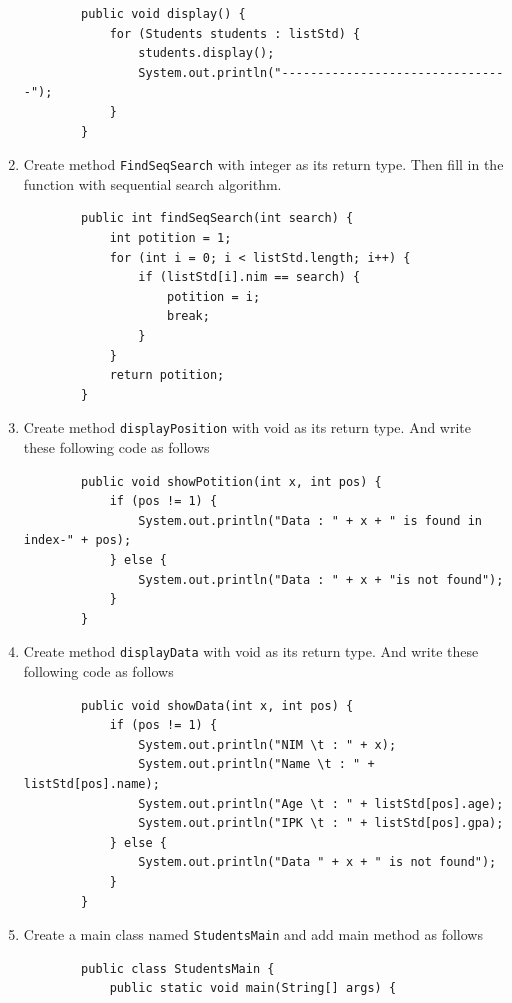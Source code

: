 \documentclass[12pt,titlepage]{article}
\begin{document}
\begin{enumerate}
    \begin{verbatim}
        public void display() {
            for (Students students : listStd) {
                students.display();
                System.out.println("--------------------------------");
            }
        }
    \end{verbatim}
    \item Create method \texttt{FindSeqSearch} with integer as its return type. Then fill in the function with sequential search algorithm.
    \begin{verbatim}
        public int findSeqSearch(int search) {
            int potition = 1;
            for (int i = 0; i < listStd.length; i++) {
                if (listStd[i].nim == search) {
                    potition = i;
                    break;
                }
            }
            return potition;
        }
    \end{verbatim}
    \item Create method \texttt{displayPosition} with void as its return type. And write these following code as follows
    \begin{verbatim}
        public void showPotition(int x, int pos) {
            if (pos != 1) {
                System.out.println("Data : " + x + " is found in index-" + pos);
            } else {
                System.out.println("Data : " + x + "is not found");
            }
        }
    \end{verbatim}
    \item Create method \texttt{displayData} with void as its return type. And write these following code as follows
    \begin{verbatim}
        public void showData(int x, int pos) {
            if (pos != 1) {
                System.out.println("NIM \t : " + x);
                System.out.println("Name \t : " + listStd[pos].name);
                System.out.println("Age \t : " + listStd[pos].age);
                System.out.println("IPK \t : " + listStd[pos].gpa);
            } else {
                System.out.println("Data " + x + " is not found");
            }
        }
    \end{verbatim}
    \item Create a main class named \texttt{StudentsMain} and add main method as follows
    \begin{verbatim}
        public class StudentsMain {
            public static void main(String[] args) {
            

\end{verbatim}
\end{enumerate}
\end{document}
